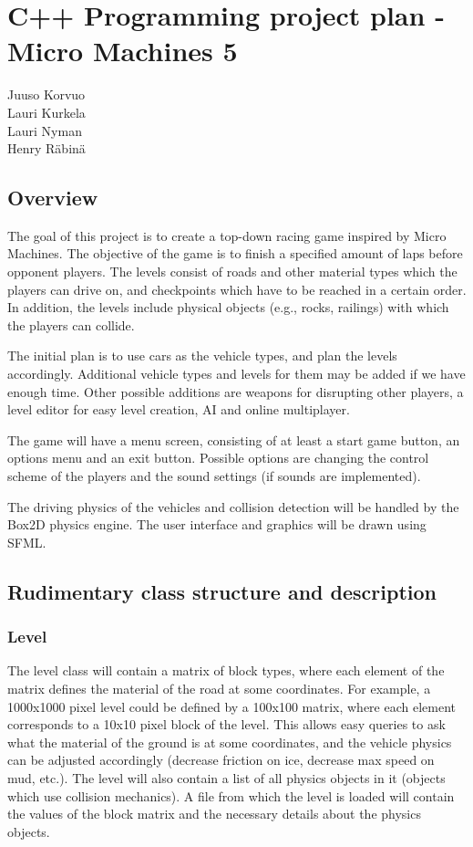 \documentclass{article}
\begin{document}
\section*{C++ Programming project plan - Micro Machines 5}
{\large Juuso Korvuo}\\
{\large Lauri Kurkela}\\
{\large Lauri Nyman}\\
{\large Henry Räbinä}

\subsection*{Overview}

The goal of this project is to create a top-down racing game inspired by Micro Machines. The objective of the game is to finish a specified amount of laps before opponent players. The levels consist of roads and other material types which the players can drive on, and checkpoints which have to be reached in a certain order. In addition, the levels include physical objects (e.g., rocks, railings) with which the players can collide.

The initial plan is to use cars as the vehicle types, and plan the levels accordingly. Additional vehicle types and levels for them may be added if we have enough time. Other possible additions are weapons for disrupting other players, a level editor for easy level creation, AI and online multiplayer.

The game will have a menu screen, consisting of at least a start game button, an options menu and an exit button. Possible options are changing the control scheme of the players and the sound settings (if sounds are implemented).

The driving physics of the vehicles and collision detection will be handled by the Box2D physics engine. The user interface and graphics will be drawn using SFML.

\subsection*{Rudimentary class structure and description}
\subsubsection*{Level}
The level class will contain a matrix of block types, where each element of the matrix defines the material of the road at some coordinates. For example, a 1000x1000 pixel level could be defined by a 100x100 matrix, where each element corresponds to a 10x10 pixel block of the level. This allows easy queries to ask what the material of the ground is at some coordinates, and the vehicle physics can be adjusted accordingly (decrease friction on ice, decrease max speed on mud, etc.). The level will also contain a list of all physics objects in it (objects which use collision mechanics). A file from which the level is loaded will contain the values of the block matrix and the necessary details about the physics objects.
\end{document}
